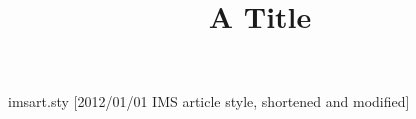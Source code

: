 \begin{filecontents*}{imsart.sty}
[2012/01/01 IMS article style, shortened and modified]
\DeclareRobustCommand\ead[2][label= ,email]{}
\newenvironment{aug}{}{\par}
\newenvironment{frontmatter}{\begin{center}}{\end{center}}
\def\and{\unskip~and~}
\def\author{\@ifnextchar[{\author@fmt}{\author@fmt[]}}
\def\author@fmt[#1]#2{\bgroup\def\fnms##1{##1}\def\snm##1{##1}#2\egroup}
\def\address{\@ifnextchar[{\address@fmt}{\address@fmt[]}}
\def\address@fmt[#1]#2{\par #2\par}
\end{filecontents*}
\documentclass{article}
\usepackage{imsart}

\begin{frontmatter}
\title{A Title}
\begin{aug}
\author{ }
\and
\author{ }
\address{Univ AB}
\end{aug}
\end{frontmatter}
Body.

